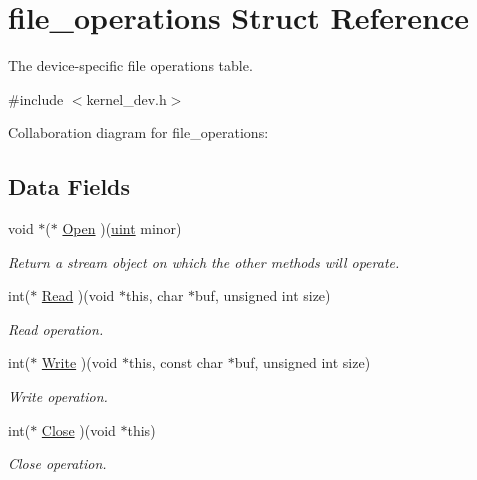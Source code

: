 \hypertarget{structfile__operations}{}\section{file\+\_\+operations Struct Reference}
\label{structfile__operations}


The device-\/specific file operations table.  




{\ttfamily \#include $<$kernel\+\_\+dev.\+h$>$}



Collaboration diagram for file\+\_\+operations\+:
\subsection*{Data Fields}
\begin{DoxyCompactItemize}
\item 
void $\ast$($\ast$ \hyperlink{structfile__operations_a2732da2af03e1fc7ba0b63a529ab1411}{Open} )(\hyperlink{bios_8h_a91ad9478d81a7aaf2593e8d9c3d06a14}{uint} minor)
\begin{DoxyCompactList}\small\item\em Return a stream object on which the other methods will operate. \end{DoxyCompactList}\item 
int($\ast$ \hyperlink{structfile__operations_a59d973a490a6861c498ac9cc9c32dbf5}{Read} )(void $\ast$this, char $\ast$buf, unsigned int size)
\begin{DoxyCompactList}\small\item\em Read operation. \end{DoxyCompactList}\item 
int($\ast$ \hyperlink{structfile__operations_a75d4020e8a146c1611dc40184d211ec6}{Write} )(void $\ast$this, const char $\ast$buf, unsigned int size)
\begin{DoxyCompactList}\small\item\em Write operation. \end{DoxyCompactList}\item 
int($\ast$ \hyperlink{structfile__operations_a66cfe706a1a29e3e58c7694dbd801b0f}{Close} )(void $\ast$this)
\begin{DoxyCompactList}\small\item\em Close operation. \end{DoxyCompactList}\end{DoxyCompactItemize}


